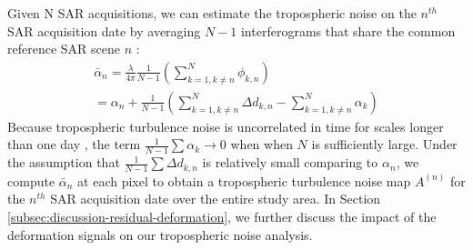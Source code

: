 \documentclass{utexasthesis}
\begin{document}
Given N SAR acquisitions, we can estimate the tropospheric noise on the $n^{th}$ SAR acquisition date by averaging $N-1$ interferograms that share the common reference SAR scene $n$ \citep{Tymofyeyeva2015MitigationAtmosphericPhase}:
\begin{multline}
\bar{\alpha}_n = \frac{\lambda}{4 \pi} \frac{1}{N-1} \left(\sum_{k=1, k \neq n}^{N} \phi_{k,n}\right)  \\
=  \alpha_n  + \frac{1}{N-1} \left( \sum_{k=1, k \neq n}^{N}  \Delta d_{k,n} - \sum_{k=1, k \neq n}^{N}  \alpha_k  \right)  \label{eq:avg-ifg} 
\end{multline}
Because tropospheric turbulence noise is uncorrelated in time for scales longer than one day \citep{Emardson2003NeutralAtmosphericDelay, Onn2006ModelingWaterVapor}, the term $ \frac{1}{N-1} \sum \alpha_k \rightarrow 0$ when  when $N$ is sufficiently large. 
Under the assumption that $ \frac{1}{N-1} \sum \Delta d_{k,n} $ is relatively small comparing to $\alpha_n$, we compute $ \bar{\alpha}_n $ at each pixel to obtain a tropospheric turbulence noise map $A^{(n)}$ for the $n^{th}$ SAR acquisition date over the entire study area. In Section \ref{subsec:discussion-residual-deformation}, we further discuss the impact of the deformation signals on our tropospheric noise analysis.
\end{document}
